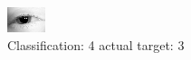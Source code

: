 \begin{figure}[h!]
\begin{center}
\includegraphics[width=0.60\columnwidth]{figures/ID25_class_4_target_3.png}
\end{center}
\caption{ Classification: 4 actual target: 3}
\label{fig:ID25_class_4_target_3}
\end{figure}

